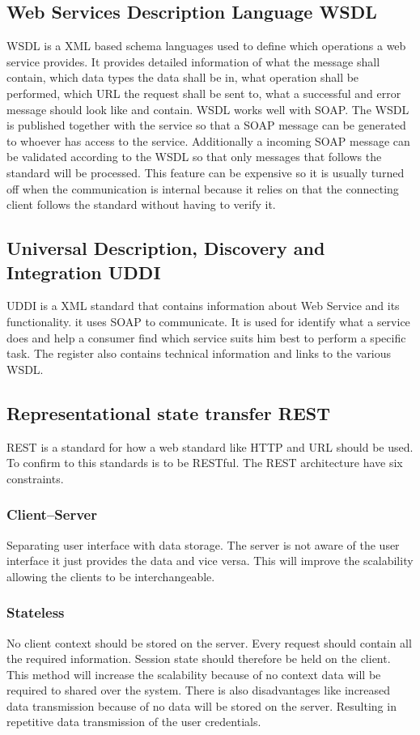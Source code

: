 \documentclass{llncs}
\begin{document}
\subsection{Web Services Description Language WSDL}
WSDL is a XML based schema languages used to define which operations a web service provides. It provides detailed information of what the message shall contain, which data types the data shall be in, what operation shall be performed, which URL the request shall be sent to, what a successful and error message should look like and contain. WSDL works well with SOAP. The WSDL is published together with the service so that a SOAP message can be generated to whoever has access to the service. Additionally a incoming SOAP message can be validated according to the WSDL so that only messages that follows the standard will be processed. This feature can be expensive so it is usually turned off when the communication is internal because it relies on that the connecting client follows the standard without having to verify it.

\subsection{Universal Description, Discovery and Integration UDDI}
UDDI is a XML standard that contains information about Web Service and its functionality. it uses SOAP to communicate. It is used for identify what a service does and help a consumer find which service suits him best to perform a specific task. The register also contains technical information and links to the various WSDL.

\subsection{Representational state transfer REST}
REST is a standard for how a web standard like HTTP and URL should be used. To confirm to this standards is to be RESTful. The REST architecture have six constraints.

\subsubsection{Client–Server}
Separating user interface with data storage. The server is not aware of the user interface it just provides the data and vice versa. This will improve the scalability allowing the clients to be interchangeable.

\subsubsection{Stateless}
No client context should be stored on the server. Every request should contain all the required information. Session state should therefore be held on the client. This method will increase the scalability because of no context data will be required to shared over the system. There is also disadvantages like increased data transmission because of no data will be stored on the server. Resulting in repetitive data transmission of the user credentials.
\end{document}
